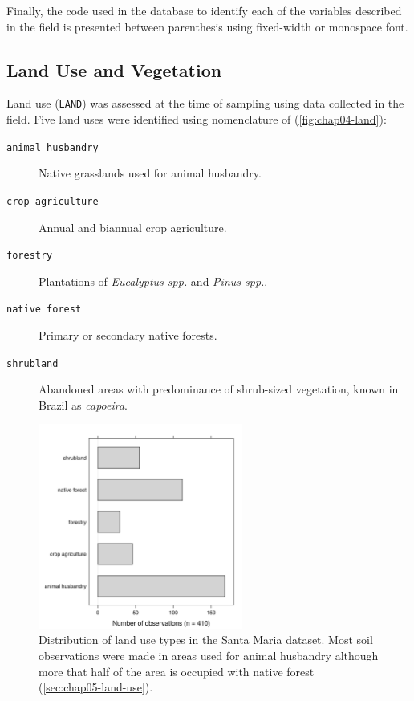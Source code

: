 Finally, the code used in the database to identify each of the variables described in the field is presented 
between parenthesis using fixed-width or monospace font.

\subsection{Land Use and Vegetation}

Land use (\texttt{LAND}) was assessed at the time of sampling using data collected in the field. Five land 
uses were identified using nomenclature of \citet{FAO2006} (\autoref{fig:chap04-land}):

\begin{description}
\item[\texttt{animal husbandry}] Native grasslands used for animal husbandry.
\item[\texttt{crop agriculture}] Annual and biannual crop agriculture.
\item[\texttt{forestry}] Plantations of \textit{Eucalyptus spp.} and \textit{Pinus spp.}.
\item[\texttt{native forest}] Primary or secondary native forests.
\item[\texttt{shrubland}] Abandoned areas with predominance of shrub-sized vegetation, known in Brazil as 
\emph{capoeira}.
\end{description}

\begin{figure}[!ht]
\centering
\includegraphics[width=0.60\textwidth]{fig/chap04-land}
\caption[Distribution of land use types in the Santa Maria dataset.]{Distribution of land use types in the 
Santa Maria dataset. Most soil observations were made in areas used for animal husbandry although more that 
half of the area is occupied with native forest (\autoref{sec:chap05-land-use}).}
\label{fig:chap04-land}
\end{figure}

